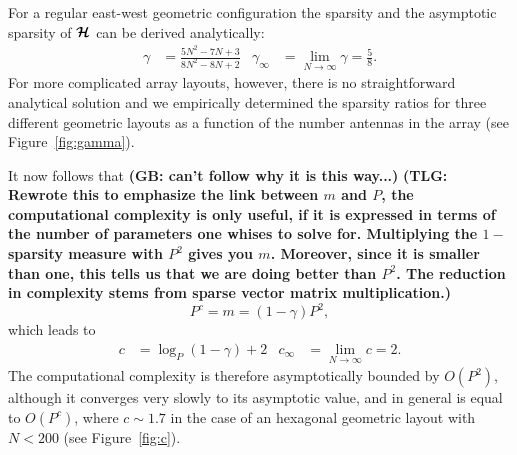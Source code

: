 \documentclass[useAMS,usenatbib]{mn2e}
\newcommand{\bmH}{\bmath{\mathcal{H}}}
\begin{document}
For a regular east-west geometric configuration the sparsity and the asymptotic sparsity of $\bmH$ can be derived analytically:
\begin{align}
\gamma &= \frac{5N^2-7N+3}{8N^2-8N+2} & \gamma_{\infty} &= \lim_{N\rightarrow \infty}\gamma = \frac{5}{8} \label{eq:gamma}. 
\end{align}
For more complicated array layouts, however, there is no straightforward analytical solution and we empirically determined the sparsity ratios for three different geometric layouts as a function of the number antennas in the array (see Figure~\ref{fig:gamma}). 

It now follows that 
{\bf (GB: can't follow why it is this way...)}
{\bf (TLG: Rewrote this to emphasize the link between $m$ and $P$, the computational complexity is only useful, if it 
is expressed in terms of the number of parameters one whises to solve for. Multiplying the $1-$ sparsity measure with $P^2$ gives you $m$. Moreover,
since it is smaller than one, this tells us that we are doing better than $P^2$. The reduction in complexity stems from sparse vector matrix multiplication.)}
\begin{equation}
P^{c} = m = (1 - \gamma)P^2,
\end{equation}
which leads to
\begin{align}
c &= \log_{P}(1 - \gamma) + 2 & c_{\infty} &= \lim_{N\rightarrow \infty} c = 2. \label{eq:c}
\end{align}
The computational complexity is therefore asymptotically bounded by $O(P^2)$, although it converges very slowly to its asymptotic value, and in general is equal to $O(P^{c})$, where $c \sim 1.7$ in the case of an hexagonal geometric layout with $N < 200$ (see Figure~\ref{fig:c}).
\end{document}
